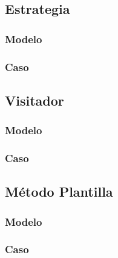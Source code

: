 \subsection{Estrategia}
\subsubsection{Modelo}
\newpage
\subsubsection{Caso}
\newpage

\subsection{Visitador}
\subsubsection{Modelo}
\newpage
\subsubsection{Caso}
\newpage

\subsection{Método Plantilla}
\subsubsection{Modelo}
\newpage
\subsubsection{Caso}
\newpage